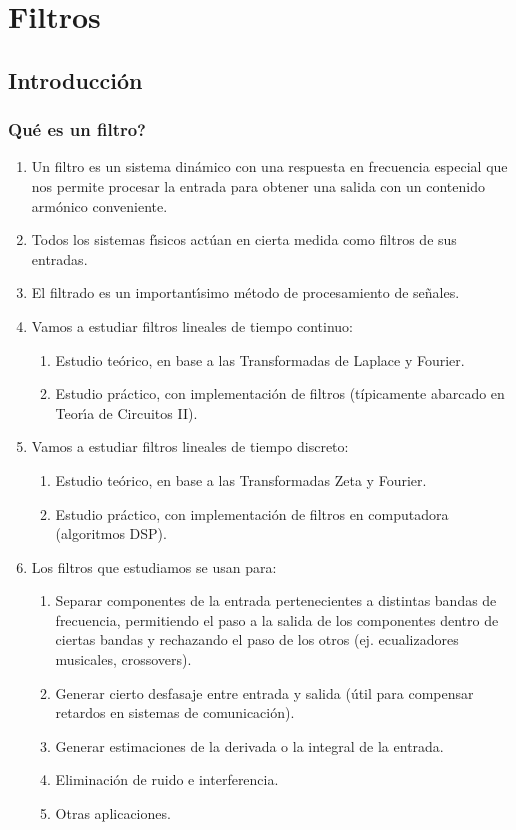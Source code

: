 \chapter{Filtros}

\section{Introducci\'{o}n}

\subsection{\textquestiondown Qu\'{e} es un filtro?}

\begin{enumerate} 
	
	\item Un filtro es un sistema din\'{a}mico con una respuesta en frecuencia especial que nos permite procesar la entrada para obtener una salida con un contenido arm\'{o}nico conveniente.
	\item Todos los sistemas f\'{\i}sicos act\'{u}an en cierta medida como filtros de sus entradas.
	\item El filtrado es un important\'{\i}simo m\'{e}todo de procesamiento de se\~{n}ales.
	\item Vamos a estudiar filtros lineales de tiempo continuo:
	\begin{enumerate}
		\item Estudio te\'{o}rico, en base a las Transformadas de Laplace y Fourier.
		\item Estudio pr\'{a}ctico, con implementaci\'{o}n de filtros (típicamente abarcado en Teor\'{\i}a de Circuitos II).
	\end{enumerate}
	
	\item Vamos a estudiar filtros lineales de tiempo discreto: 
	\begin{enumerate}
		\item Estudio te\'{o}rico, en base a las Transformadas Zeta y Fourier.
		\item Estudio pr\'{a}ctico, con implementaci\'{o}n de filtros en computadora (algoritmos DSP).
	\end{enumerate}
	
	\item Los filtros que estudiamos se usan para:
	\begin{enumerate}
		\item Separar componentes de la entrada pertenecientes a distintas bandas de frecuencia, permitiendo el paso a la salida de los componentes dentro de ciertas bandas y rechazando el paso de los otros (ej. ecualizadores musicales, crossovers).
		\item Generar cierto desfasaje entre entrada y salida (\'{u}til para compensar retardos en sistemas de comunicaci\'{o}n).
		\item Generar estimaciones de la derivada o la integral de la entrada.
		\item Eliminaci\'{o}n de ruido e interferencia.
		\item Otras aplicaciones.
	\end{enumerate}
	

\end{enumerate}
